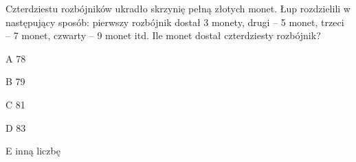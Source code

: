 \begin{tresc}
Czterdziestu rozbójników ukradło skrzynię pełną złotych monet. Łup rozdzielili w następujący sposób: pierwszy rozbójnik dostał 3 monety, drugi – 5 monet, trzeci – 7 monet, czwarty – 9 monet itd. Ile monet dostał czterdziesty rozbójnik?
\end{tresc}
\begin{wariant}{A} 78 \end{wariant}
\begin{wariant}{B} 79 \end{wariant}
\begin{wariant}{C} 81 \end{wariant}
\begin{wariant}{D} 83 \end{wariant}
\begin{wariant}{E} inną liczbę \end{wariant}
